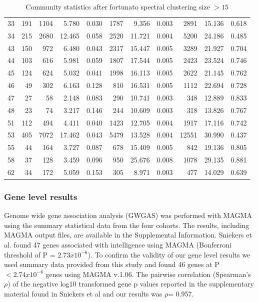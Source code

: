 \begin{table}[ht]
\begin{adjustbox}{max width=\textwidth}
\begin{tabular}{lrrrrrrrrrr}
  33 & 191 & 1104 & 5.780 & 0.030 & 1787 & 9.356 & 0.003 & 2891 & 15.136 & 0.618 \\ 
  34 & 215 & 2680 & 12.465 & 0.058 & 2520 & 11.721 & 0.004 & 5200 & 24.186 & 0.485 \\ 
  43 & 150 & 972 & 6.480 & 0.043 & 2317 & 15.447 & 0.005 & 3289 & 21.927 & 0.704 \\ 
  44 & 103 & 616 & 5.981 & 0.059 & 1807 & 17.544 & 0.005 & 2423 & 23.524 & 0.746 \\ 
  45 & 124 & 624 & 5.032 & 0.041 & 1998 & 16.113 & 0.005 & 2622 & 21.145 & 0.762 \\ 
  46 & 49 & 302 & 6.163 & 0.128 & 810 & 16.531 & 0.005 & 1112 & 22.694 & 0.728 \\ 
  47 & 27 & 58 & 2.148 & 0.083 & 290 & 10.741 & 0.003 & 348 & 12.889 & 0.833 \\ 
  48 & 23 & 74 & 3.217 & 0.146 & 244 & 10.609 & 0.003 & 318 & 13.826 & 0.767 \\ 
  51 & 112 & 494 & 4.411 & 0.040 & 1423 & 12.705 & 0.004 & 1917 & 17.116 & 0.742 \\ 
  53 & 405 & 7072 & 17.462 & 0.043 & 5479 & 13.528 & 0.004 & 12551 & 30.990 & 0.437 \\ 
  55 & 44 & 164 & 3.727 & 0.087 & 678 & 15.409 & 0.005 & 842 & 19.136 & 0.805 \\ 
  58 & 37 & 128 & 3.459 & 0.096 & 950 & 25.676 & 0.008 & 1078 & 29.135 & 0.881 \\ 
  62 & 34 & 172 & 5.059 & 0.153 & 305 & 8.971 & 0.003 & 477 & 14.029 & 0.639 \\ 
   \hline
\end{tabular}
\end{adjustbox}
\caption{Community statistics after fortunato spectral clustering size $> 15$} 
\label{tab:Community statistics after fortunato spectral clustering size > 15}
\end{table}
\subsubsection{Gene level results}

Genome wide gene association analysis (GWGAS) was performed with MAGMA using the summary statistical data from the four cohorts. The results, including MAGMA output files, are available in the Supplemental Information.
Sniekers et al. found 47 genes associated with intelligence using MAGMA (Bonferroni threshold of P = $2.73 x 10^{-6}$). \cite{sniekers2017genome}  To confirm the validity of our gene level results we used summary data provided from this study and found 46 genes at  P$<2.74 x 10^{-6}$ genes using MAGMA v.1.06.  The pairwise correlation (Spearman’s $\rho$) of the negative log10 transformed gene p values reported in the supplementary material found in Sniekers et al and our results was $\rho$= 0.957. \cite{sniekers2017genome} 



